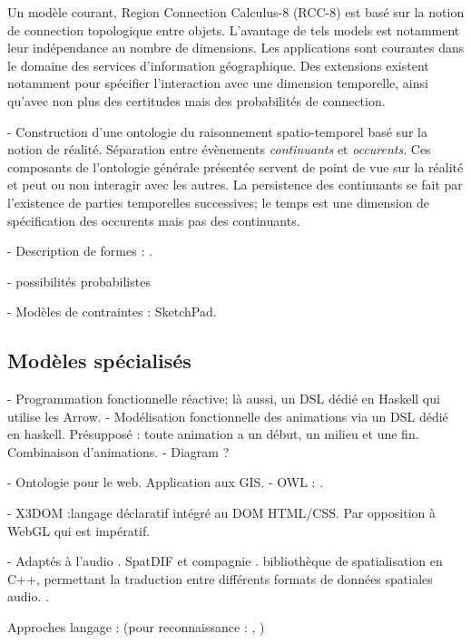 \documentclass[french,12pt]{article}
\begin{document}
Un modèle courant, Region Connection Calculus-8 (RCC-8) est basé sur la notion de connection topologique entre objets\cite{schlieder_qualitative_1996,dorr_qualitative_2014}. L'avantage de tels models est notamment leur indépendance au nombre de dimensions. Les applications sont courantes dans le domaine des services d'information géographique\cite{bhatt_geospatial_2014}. Des extensions existent notamment pour spécifier l'interaction avec une dimension temporelle\cite{hazarika_qualitative_2012}, ainsi qu'avec non plus des certitudes mais des probabilités de connection\cite{girlea_probabilistic_2012}.

- Construction d'une ontologie du raisonnement spatio-temporel basé sur la notion de réalité. Séparation entre évènements \textit{continuants} et \textit{occurents}. Ces composants de l'ontologie générale présentée servent de point de vue sur la réalité et peut ou non interagir avec les autres. La persistence des continuants se fait par l'existence de parties temporelles successives; le temps est une dimension de spécification des occurents mais pas des continuants.
\cite{grenon_formal_2003}

- Description de formes : \cite{clementini_global_1997}.


- possibilités probabilistes


- Modèles de contraintes : SketchPad.
\subsection{Modèles spécialisés}
- Programmation fonctionnelle réactive; là aussi, un DSL dédié en Haskell qui utilise les Arrow.
\cite{hudak_arrows_2003}
- Modélisation fonctionnelle des animations via un DSL dédié en haskell. Présupposé : toute animation a un début, un milieu et une fin. Combinaison d'animations.
\cite{matlage_every_2011}
- Diagram ?

- Ontologie pour le web. Application aux \ac{GIS}.
- OWL : \cite{mefteh_approche_2013}.

- X3DOM :langage déclaratif intégré au DOM HTML/CSS\cite{jankowski_declarative_2013}. Par opposition à WebGL qui est impératif.

- Adaptés à l'audio
. SpatDIF et compagnie \cite{peters_spatial_2013}\cite{kendall_towards_2008}
. bibliothèque de spatialisation en C++, permettant la traduction entre différents formats de données spatiales audio. \cite{wozniewski_spatosc:_2012}
. \cite{kondoz_object-based_2014}

Approches langage : (pour reconnaissance : \cite{spranger_recruitment_2011}\cite{spranger_emergent_2012}, )

\printbibliography
\end{document}
